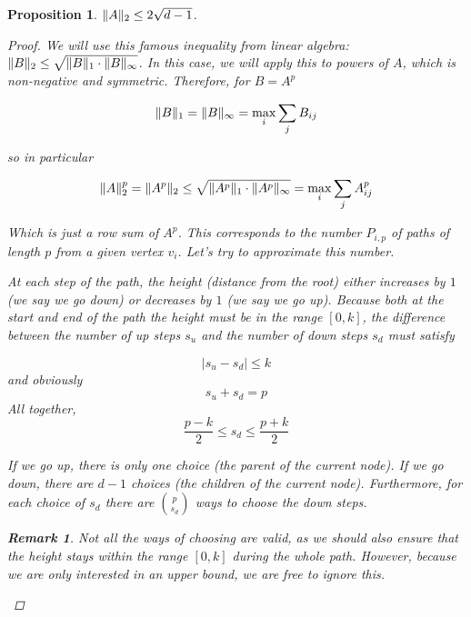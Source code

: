 \documentclass{amsart}
\theoremstyle{plain}
\newtheorem*{proposition}{\textbf{Proposition}}
\theoremstyle{definition}
\newtheorem*{rk}{\textbf{Remark}}
\DeclarePairedDelimiter{\norm}{\lVert}{\rVert}
\begin{document}
    \begin{proposition} \label{prop:a}
        $\norm{A}_2 \leq 2 \sqrt{d - 1}$.
        \begin{proof}
            We will use this famous inequality from linear algebra:
            $\norm{B}_2 \leq \sqrt{ \norm{B}_1 \cdot \norm{B}_\infty }$.
            In this case, we will apply this to powers of $A$, which is non-negative and symmetric.
            Therefore, for $B = A^p$

            \begin{equation*}
                \norm{B}_1 = \norm{B}_{\infty} = \max_{i} \sum_{j} B_{ij}
            \end{equation*}

            so in particular

            \begin{equation}
                \norm{A}_2^p = \norm{A^p}_2 \leq \sqrt{\norm{A^p}_1 \cdot \norm{A^p}_{\infty}} = \max_{i} \sum_{j} A^p_{ij}
                \label{eq:norm_bound}
            \end{equation}

            Which is just a row sum of $A^p$.
            This corresponds to the number $P_{i, p}$ of paths of length $p$ from a given vertex $v_i$.
            Let's try to approximate this number.

            At each step of the path, the height (distance from the root) either increases by $1$
            (we say we go \emph{down})
            or decreases by $1$ (we say we go \emph{up}).
            Because both at the start and end of the path the height must be in the range $[0, k]$,
            the difference between the number of \emph{up} steps $s_{u}$
            and the number of \emph{down} steps $s_{d}$ must satisfy

            \begin{equation*}
                \lvert s_{u} - s_{d} \rvert \leq k
            \end{equation*}
            and obviously
            \begin{equation*}
                s_{u} + s_{d} = p
            \end{equation*}
            All together,
            \begin{equation*}
                \frac{p-k}{2} \leq s_d \leq  \frac{p+k}{2}
            \end{equation*}

            If we go \emph{up}, there is only one choice (the parent of the current node).
            If we go \emph{down}, there are $d-1$ choices (the children of the current node).
            Furthermore, for each choice of $s_d$ there are $\binom{p}{s_d}$
            ways to choose the \emph{down} steps.
            \begin{rk}
                Not all the ways of choosing are valid, as we should also ensure that the
                height stays within the range $[0, k]$ during the whole path.
                However, because we are only interested in an upper bound,
                we are free to ignore this.
            \end{rk}


\end{proof}
\end{proposition}
\end{document}
